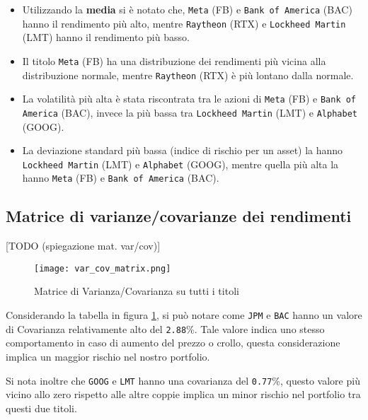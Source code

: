 \begin{itemize}
  \item Utilizzando la \textbf{media} si è notato che, \verb|Meta| (FB) e \verb|Bank of America| (BAC) hanno il rendimento più alto,
  mentre \verb|Raytheon| (RTX) e \verb|Lockheed Martin| (LMT) hanno il rendimento più basso.
  \item Il titolo \verb|Meta| (FB) ha una distribuzione dei rendimenti più vicina alla distribuzione normale, mentre 
  \verb|Raytheon| (RTX) è più lontano dalla normale.
  \item La volatilità più alta è stata riscontrata tra le azioni di \verb|Meta| (FB) e \verb|Bank of America| (BAC), invece
  la più bassa tra \verb|Lockheed Martin| (LMT) e \verb|Alphabet| (GOOG).
  \item La deviazione standard più bassa (indice di rischio per un asset) la hanno \verb|Lockheed Martin| (LMT) e \verb|Alphabet| (GOOG), mentre
  quella più alta la hanno \verb|Meta| (FB) e \verb|Bank of America| (BAC).
\end{itemize}

\pagebreak


\subsection{Matrice di varianze/covarianze dei rendimenti}

[TODO (spiegazione mat. var/cov)]

\begin{figure}[h]
  \centering
  \texttt{[image: var\_cov\_matrix.png]}
  \caption{Matrice di Varianza/Covarianza su tutti i titoli}
  \label{fig:var_cov_matrix}
\end{figure}

Considerando la tabella in figura \ref{fig:var_cov_matrix}, si può notare come \verb|JPM| e \verb|BAC| hanno un valore di Covarianza
relativamente alto del \verb|2.88|\%. Tale valore indica uno stesso comportamento in caso di aumento del prezzo o crollo, questa considerazione implica
un maggior rischio nel nostro portfolio.

Si nota inoltre che \verb|GOOG| e \verb|LMT| hanno una covarianza del \verb|0.77|\%, questo valore più vicino allo zero rispetto alle altre coppie implica
un minor rischio nel portfolio tra questi due titoli.


